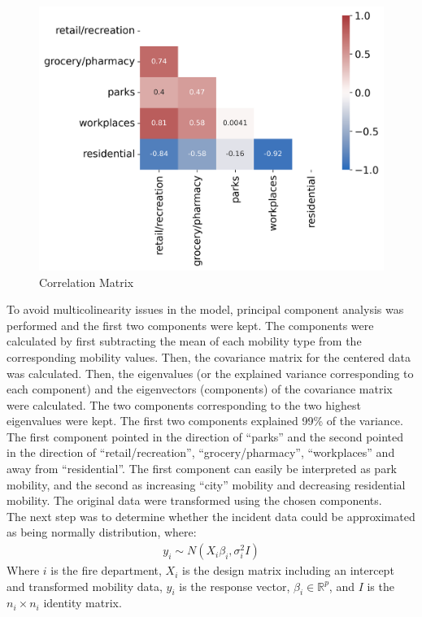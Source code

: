 \documentclass[paper=a4, fontsize=11pt]{scrartcl}
\numberwithin{equation}{section}		%
\numberwithin{figure}{section}			%
\numberwithin{table}{section}				%
\begin{document}
\begin{figure}[h]\label{corr_mat}
\centering
\includegraphics[width=.7\textwidth]{corr.png}
\caption{Correlation Matrix}
\end{figure}

To avoid multicolinearity issues in the model, principal component analysis was performed and the first two components were kept. The components were calculated by first subtracting the mean of each mobility type from the corresponding mobility values. Then, the covariance matrix for the centered data was calculated. Then, the eigenvalues (or the explained variance corresponding to each component) and the eigenvectors (components) of the covariance matrix were calculated. The two components corresponding to the two highest eigenvalues were kept. The first two components explained 99\% of the variance. The first component  pointed in the direction of ``parks'' and the second pointed in the direction of ``retail/recreation'', ``grocery/pharmacy'', ``workplaces'' and away from ``residential''. The first component can easily be interpreted as park mobility, and the second as increasing ``city'' mobility and decreasing residential mobility. The original data were transformed using the chosen components.\\

The next step was to determine whether the incident data could be approximated as being normally distribution, where:
\begin{align*}
    y_i \sim N(X_i \beta_i, \sigma_i^2I)
\end{align*}
Where $i$ is the fire department, $X_i$ is the design matrix including an intercept and transformed mobility data, $y_i$ is the response vector, $\beta_i \in \mathbb{R}^{p}$, and $I$ is the $n_i \times n_i$ identity matrix. 
    
\end{document}
